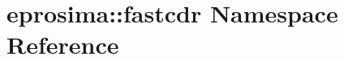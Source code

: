 \hypertarget{namespaceeprosima_1_1fastcdr}{\section{eprosima\-:\-:fastcdr Namespace Reference}
\label{namespaceeprosima_1_1fastcdr}
}
